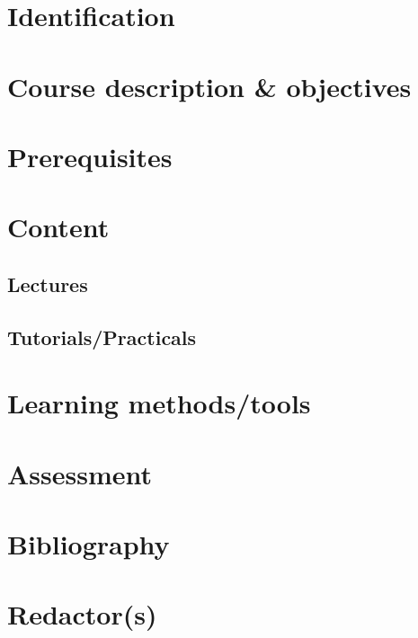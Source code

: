 \documentclass[info]{esisyllabus}
\begin{document}
	
	\section{Identification}

	\printidentification
	
	\section{Course description \& objectives}

	\printabstract
	
	\printobjectives
	
	\section{Prerequisites}
	
	\printprerequisites
	
	\section{Content}
	
	\subsection{Lectures}
	
	\printchapters
	
	\subsection{Tutorials/Practicals}
	
	\printpracticals
	
	\section{Learning methods/tools}
	
	\printmethods
	
	\section{Assessment}
	
	\printassessment

	\section{Bibliography}
	
	
	\nocite{*}
	\renewcommand{\bibsection}{}
	
	
	
	\section{Redactor(s)}
	
	\printredactors
	
	\printreviewers
	
\end{document}
